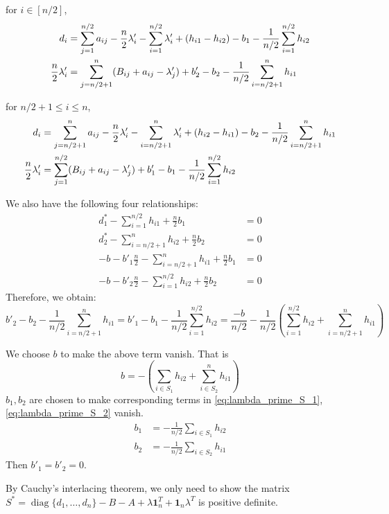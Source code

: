 \documentclass{ctexart}
\DeclareMathOperator{\diag}{diag}
\begin{document}
for $i\in [n/2]$,
\begin{align}
	d_i &= \sum_{j=1}^{n/2} a_{ij}
	- \frac{n}{2} \lambda'_i - \sum_{i=1}^{n/2} \lambda'_i + (h_{i1}- h_{i2}) - b_1 - \frac{1}{n/2}\sum_{i=1}^{n/2}h_{i2}
	\label{eq:lambda_prime_S_1}\\
	\frac{n}{2} \lambda'_i &= \sum_{j=n/2 + 1}^{n} (B_{ij} + a_{ij} - \lambda'_j) + b'_2 - b_2- \frac{1}{n/2}\sum_{i=n/2+1}^{n}h_{i1}
	\notag
\end{align}

for $n/2+1 \leq i \leq n$,
\begin{align}
	d_i &= \sum_{j=n/2+1}^{n} a_{ij}
	- \frac{n}{2} \lambda'_i - \sum_{i=n/2+1}^{n} \lambda'_i + (h_{i2} - h_{i1}) - b_2 -\frac{1}{n/2}\sum_{i=n/2+1}^{n}h_{i1}
	\label{eq:lambda_prime_S_2}\\
	\frac{n}{2} \lambda'_i &= \sum_{j=1}^{n/2} (B_{ij} + a_{ij} - \lambda'_j) + b'_1  - b_1- \frac{1}{n/2}\sum_{i=1}^{n/2}h_{i2}
	\notag
\end{align}

We also have the following four relationships:
\begin{align*}
d^*_1 - \sum_{i=1}^{n/2} h_{i1}	+ \frac{n}{2} b_1 & = 0\\
d^*_2 - \sum_{i=n/2+1}^{n} h_{i2} + \frac{n}{2} b_2 & = 0\\
-b - b'_1 \frac{n}{2} -  \sum_{i=n/2+1}^{n} h_{i1} + \frac{n}{2} b_1 & = 0\\
-b - b'_2 \frac{n}{2} -  \sum_{i=1}^{n/2} h_{i2} + \frac{n}{2} b_2 & = 0
\end{align*}
Therefore, we obtain:
\begin{equation*}
	b'_2 - b_2- \frac{1}{n/2}\sum_{i=n/2+1}^{n}h_{i1}
	=b'_1  - b_1- \frac{1}{n/2}\sum_{i=1}^{n/2}h_{i2}
	= \frac{-b}{n/2} - \frac{1}{n/2}
	\left(\sum_{i=1}^{n/2} h_{i2} + \sum_{i=n/2+1}^n h_{i1} \right)
\end{equation*}

We choose $b$ to make the above term vanish.
That is
\begin{equation*}
	b = -(\sum_{i \in S_1} h_{i2} + \sum_{i \in S_2}^n h_{i1} )
\end{equation*}
$b_1,b_2$ are chosen to make corresponding terms in \eqref{eq:lambda_prime_S_1},\eqref{eq:lambda_prime_S_2} vanish.
\begin{align*}
	b_1 &= - \frac{1}{n/2}\sum_{i \in S_1}h_{i2} \\
	b_2 &= - \frac{1}{n/2}\sum_{i \in S_2}h_{i1}
\end{align*}
Then $b'_1=b'_2=0$.

By Cauchy's interlacing theorem, we only need to show
the matrix $S^*=\diag\{d_1,\dots, d_n\} - B -A + \lambda \mathbf{1}^T_{n} + \mathbf{1}_{n} \lambda^T$ is positive definite.


	
\end{document}
